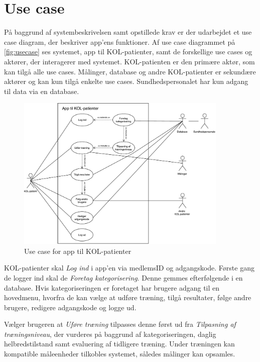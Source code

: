 \section{Use case} \label{sec:usecase} 
På baggrund af systembeskrivelsen samt opstillede krav er der udarbejdet et use case diagram, der beskriver app'ens funktioner. Af use case diagrammet på \autoref{fig:usecase} ses systemet, app til KOL-patienter, samt de forskellige use cases og aktører, der interagerer med systemet. KOL-patienten er den primære aktør, som kan tilgå alle use cases. Målinger, database og andre KOL-patienter er sekundære aktører og kan kun tilgå enkelte use cases. Sundhedspersonalet har kun adgang til data via en database. 

\begin{figure} [H]
\centering
\includegraphics[width=0.9\textwidth]{figures/aktivitetsdiagram/Usecase}
\caption{Use case for app til KOL-patienter}
\label{fig:usecase}
\end{figure}

\noindent
KOL-patienter skal \textit{Log ind} i app'en via medlemsID og adgangskode. Første gang de logger ind skal de \textit{Foretag kategorisering}. Denne gemmes efterfølgende i en database.
Hvis kategoriseringen er foretaget har brugere adgang til en hovedmenu, hvorfra de kan vælge at udføre træning, tilgå resultater, følge andre brugere, redigere adgangskode og logge ud. 

Vælger brugeren at \textit{Uføre træning} tilpasses denne først ud fra \textit{Tilpasning af træningsniveau}, der vurderes på baggrund af kategoriseringen, daglig helbredstilstand samt evaluering af tidligere træning. 
Under træningen kan kompatible måleenheder tilkobles systemet, således målinger kan opsamles. 

